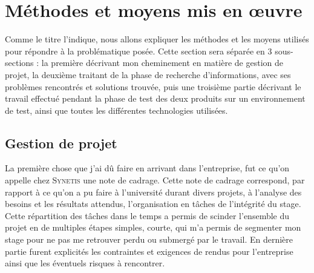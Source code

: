 \section{Méthodes et moyens mis en œuvre}
\label{sec:meth_moy}

Comme le titre l'indique, nous allons expliquer les méthodes et les moyens utilisés pour répondre à la problématique posée. Cette section sera séparée en 3 sous-sections : la première décrivant mon cheminement en matière de gestion de projet, la deuxième traitant de la phase de recherche d'informations, avec ses problèmes rencontrés et solutions trouvée, puis une troisième partie décrivant le travail effectué pendant la phase de test des deux produits sur un environnement de test, ainsi que toutes les différentes technologies utilisées.

\subsection{Gestion de projet}
\label{subsec:gestion}

La première chose que j'ai dû faire en arrivant dans l'entreprise, fut ce qu'on appelle chez \textsc{Synetis} une note de cadrage. Cette note de cadrage correspond, par rapport à ce qu'on a pu faire à l'université durant divers projets, à l'analyse des besoins et les résultats attendus, l'organisation en tâches de l'intégrité du stage. Cette répartition des tâches dans le temps a permis de scinder l'ensemble du projet en de multiples étapes simples, courte, qui m'a permis de segmenter mon stage pour ne pas me retrouver perdu ou submergé par le travail. En dernière partie furent explicités les contraintes et exigences de rendus pour l'entreprise ainsi que les éventuels risques à rencontrer.\\

